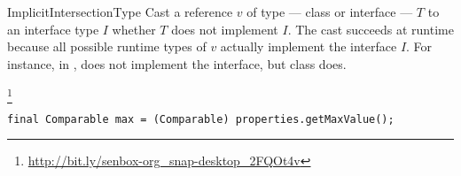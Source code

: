 \begin{pattern}{ImplicitIntersectionType}
Cast a reference $v$ of type --- class or interface --- $T$ to an
interface type $I$ whether $T$ does not implement $I$.
The cast succeeds at runtime because all possible runtime types of $v$
actually implement the interface $I$.
For instance, in ,  does not
implement the  interface, but class  does.

\instances{}

\footnote{\url{http://bit.ly/senbox-org_snap-desktop_2FQOt4v}}

\begin{verbatim}
final Comparable max = (Comparable) properties.getMaxValue();
\end{verbatim}

\detection{}

\discussion{}

\related{}

\end{pattern}
